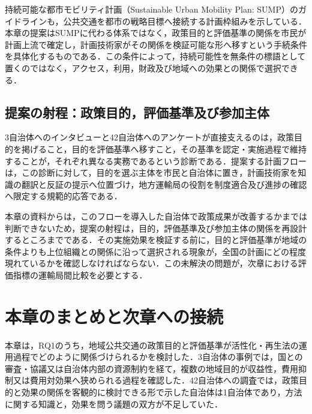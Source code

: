 持続可能な都市モビリティ計画（Sustainable Urban Mobility Plan: SUMP）のガイドライン\cite{chiikikotsu2022}も，公共交通を都市の戦略目標へ接続する計画枠組みを示している．本章の提案はSUMPに代わる体系ではなく，政策目的と評価基準の関係を市民が計画上流で確定し，計画技術家がその関係を検証可能な形へ移すという手続条件を具体化するものである．この条件によって，持続可能性を無条件の標語として置くのではなく，アクセス，利用，財政及び地域への効果との関係で選択できる．

\subsection{提案の射程：政策目的，評価基準及び参加主体}
\label{subsec:ch5_executive_creativity}

3自治体へのインタビューと42自治体へのアンケートが直接支えるのは，政策目的を掲げること，目的を評価基準へ移すこと，その基準を認定・実施過程で維持することが，それぞれ異なる実務であるという診断である．提案する計画フローは，この診断に対して，目的を選ぶ主体を市民と自治体に置き，計画技術家を知識の翻訳と反証の提示へ位置づけ，地方運輸局の役割を制度適合及び進捗の確認へ限定する規範的応答である．

本章の資料からは，このフローを導入した自治体で政策成果が改善するかまでは判断できないため，提案の射程は，目的，評価基準及び参加主体の関係を再設計するところまでである．その実施効果を検証する前に，目的と評価基準が地域の条件よりも上位組織との関係に沿って選択される現象が，全国の計画にどの程度現れているかを確認しなければならない．この未解決の問題が，次章における評価指標の運輸局間比較を必要とする．

\section{本章のまとめと次章への接続}
\label{sec:ch5_conclusion}

本章は，RQ1のうち，地域公共交通の政策目的と評価基準が活性化・再生法の運用過程でどのように関係づけられるかを検討した．3自治体の事例では，国との審査・協議又は自治体内部の資源制約を経て，複数の地域目的が収益性，費用抑制又は費用対効果へ狭められる過程を確認した．42自治体への調査では，政策目的と効果の関係を客観的に検討できる形で示した自治体は1自治体であり，方法に関する知識と，効果を問う議題の双方が不足していた．

